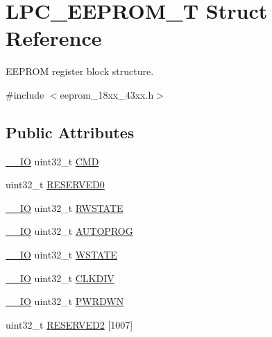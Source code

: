 \hypertarget{struct_l_p_c___e_e_p_r_o_m___t}{}\section{L\+P\+C\+\_\+\+E\+E\+P\+R\+O\+M\+\_\+T Struct Reference}
\label{struct_l_p_c___e_e_p_r_o_m___t}


E\+E\+P\+R\+OM register block structure.  




{\ttfamily \#include $<$eeprom\+\_\+18xx\+\_\+43xx.\+h$>$}

\subsection*{Public Attributes}
\begin{DoxyCompactItemize}
\item 
\hyperlink{core__sc300_8h_aec43007d9998a0a0e01faede4133d6be}{\+\_\+\+\_\+\+IO} uint32\+\_\+t \hyperlink{struct_l_p_c___e_e_p_r_o_m___t_aac6ea16d595bcdc476f09f5d650ed51a}{C\+MD}
\item 
uint32\+\_\+t \hyperlink{struct_l_p_c___e_e_p_r_o_m___t_ac704e7a261eef0826d18b393a439b976}{R\+E\+S\+E\+R\+V\+E\+D0}
\item 
\hyperlink{core__sc300_8h_aec43007d9998a0a0e01faede4133d6be}{\+\_\+\+\_\+\+IO} uint32\+\_\+t \hyperlink{struct_l_p_c___e_e_p_r_o_m___t_a67ce6bf0454c6a840f9f7879c5320195}{R\+W\+S\+T\+A\+TE}
\item 
\hyperlink{core__sc300_8h_aec43007d9998a0a0e01faede4133d6be}{\+\_\+\+\_\+\+IO} uint32\+\_\+t \hyperlink{struct_l_p_c___e_e_p_r_o_m___t_a2d801a9373a234be9989b0138d072ae2}{A\+U\+T\+O\+P\+R\+OG}
\item 
\hyperlink{core__sc300_8h_aec43007d9998a0a0e01faede4133d6be}{\+\_\+\+\_\+\+IO} uint32\+\_\+t \hyperlink{struct_l_p_c___e_e_p_r_o_m___t_a14d53f1ccce20c3cd1a0714de7d9c907}{W\+S\+T\+A\+TE}
\item 
\hyperlink{core__sc300_8h_aec43007d9998a0a0e01faede4133d6be}{\+\_\+\+\_\+\+IO} uint32\+\_\+t \hyperlink{struct_l_p_c___e_e_p_r_o_m___t_a5f3894157767f70ca15a1d94a877dd22}{C\+L\+K\+D\+IV}
\item 
\hyperlink{core__sc300_8h_aec43007d9998a0a0e01faede4133d6be}{\+\_\+\+\_\+\+IO} uint32\+\_\+t \hyperlink{struct_l_p_c___e_e_p_r_o_m___t_a0e2b18e0027f5c20642449755d729696}{P\+W\+R\+D\+WN}
\item 
uint32\+\_\+t \hyperlink{struct_l_p_c___e_e_p_r_o_m___t_a68b93d7380a14c03f923c701306fee10}{R\+E\+S\+E\+R\+V\+E\+D2} \mbox{[}1007\mbox{]}

\end{DoxyCompactItemize}
